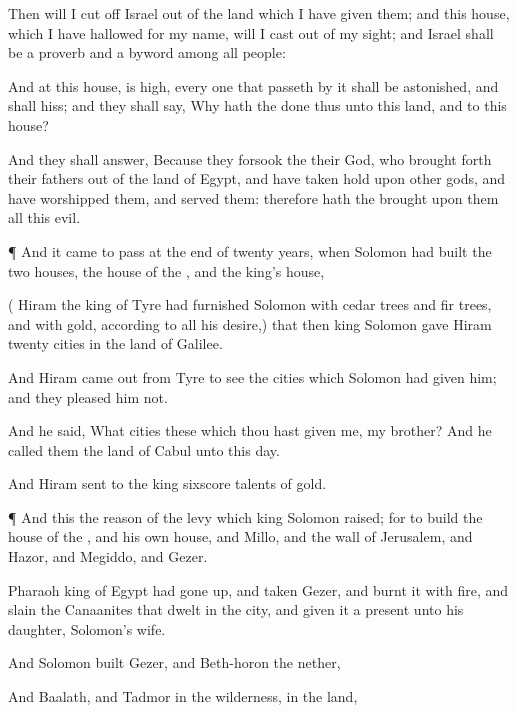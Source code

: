 {Then will I cut
off
Israel
out of the
land which I have
given them; and this
house, which I have
hallowed for my
name, will I cast
out of my
sight; and
Israel shall be a
proverb and a
byword among all
people:

And at this
house,
{} is
high, every one that
passeth by it shall be
astonished, and shall
hiss; and they shall
say, Why hath the
{}
done thus unto this
land, and to this
house?

And they shall
answer, Because they
forsook the
{} their
God, who brought
forth their
fathers out of the
land of
Egypt, and have taken
hold upon
other
gods, and have
worshipped them, and
served them: therefore hath the
{}
brought upon them all this
evil.


\par }{\PP {}¶ And it came to pass at the
end of
twenty
years, when
Solomon had
built the
two
houses, the
house of the
{}, and the
king’s
house,

({}
Hiram the
king of
Tyre had
furnished
Solomon with
cedar
trees and
fir
trees, and with
gold, according to all his
desire,) that
then
king
Solomon
gave
Hiram
twenty
cities in the
land of
Galilee.

And
Hiram came
out from
Tyre to
see the
cities which
Solomon had
given him; and they
pleased him not.

And he
said, What
cities
{} these which thou hast
given me, my
brother? And he
called them the
land of
Cabul unto this
day.

And
Hiram
sent to the
king
sixscore
talents of
gold.


\par }{\PP {}¶ And this
{} the
reason of the
levy which
king
Solomon
raised; for to
build the
house of the
{}, and his own
house, and
Millo, and the
wall of
Jerusalem, and
Hazor, and
Megiddo, and
Gezer.

Pharaoh
king of
Egypt had gone
up, and
taken
Gezer, and
burnt it with
fire, and
slain the
Canaanites that
dwelt in the
city, and
given it
{} a
present unto his
daughter,
Solomon’s
wife.

And
Solomon
built
Gezer, and
Beth-horon the
nether,

And
Baalath, and
Tadmor in the
wilderness, in the
land,

}
